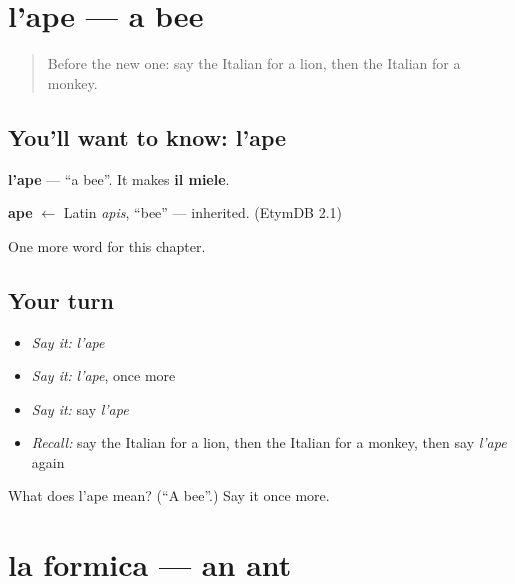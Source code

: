 \section[l'ape]{l'ape — a bee}

\label{lesson:IT-C71-ape}



\begin{quote}
Before the new one: say the Italian for a lion, then the Italian for a monkey.
\end{quote}

\subsection*{You'll want to know: l'ape}
\textbf{l'ape} — \textquotedblleft{}a bee\textquotedblright{}. It makes \textbf{il miele}.

\begin{cousinweb}
\textbf{ape} $\leftarrow$ Latin \emph{apis}, \textquotedblleft{}bee\textquotedblright{} — inherited. (EtymDB 2.1)
\end{cousinweb}

\begin{grammarlens}[title={What you've built}]
One more word for this chapter.
\end{grammarlens}

\subsection*{Your turn}
\begin{itemize}
\raggedright
  \item \emph{Say it:} \emph{l'ape}
  \item \emph{Say it:} \emph{l'ape}, once more
  \item \emph{Say it:} say \emph{l'ape}
  \item \emph{Recall:} say the Italian for a lion, then the Italian for a monkey, then say \emph{l'ape} again
\end{itemize}

\begin{tcolorbox}[breakable,colback=teal!4,colframe=teal!35!black,title={Before you move on}]
What does l'ape mean? (\textquotedblleft{}A bee\textquotedblright{}.) Say it once more.
\end{tcolorbox}
\section[la formica]{la formica — an ant}

